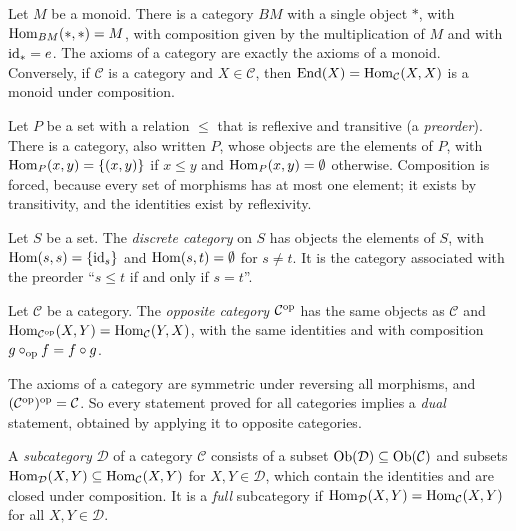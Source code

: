 \begin{example}\label{categories:example-monoid-as-category}
Let $M$ be a monoid. There is a category $BM$ with a single object $\ast$,
with $\operatorname{Hom}_{BM}(\ast, \ast) = M$, with composition given by the multiplication
of $M$ and with $\mathrm{id}_\ast = e$. The axioms of a category are exactly the axioms
of a monoid. Conversely, if $\mathcal{C}$ is a category and $X \in \mathcal{C}$,
then $\operatorname{End}(X) = \operatorname{Hom}_{\mathcal{C}}(X, X)$ is a monoid under composition.
\end{example}

\begin{example}\label{categories:example-preorder}
Let $P$ be a set with a relation $\leq$ that is reflexive and transitive (a
\emph{preorder}). There is a category, also written $P$, whose objects are the
elements of $P$, with $\operatorname{Hom}_P(x, y) = \{(x, y)\}$ if $x \leq y$ and
$\operatorname{Hom}_P(x, y) = \emptyset$ otherwise. Composition is forced, because every set
of morphisms has at most one element; it exists by transitivity, and the
identities exist by reflexivity.
\end{example}

\begin{example}\label{categories:example-discrete}
Let $S$ be a set. The \emph{discrete category} on $S$ has objects the elements
of $S$, with $\operatorname{Hom}(s, s) = \{\mathrm{id}_s\}$ and $\operatorname{Hom}(s, t) = \emptyset$ for
$s \neq t$. It is the category associated with the preorder ``$s \leq t$ if and
only if $s = t$''.
\end{example}

\begin{definition}\label{categories:definition-opposite}
Let $\mathcal{C}$ be a category. The \emph{opposite category}
$\mathcal{C}^{\mathrm{op}}$ has the same objects as $\mathcal{C}$ and
$\operatorname{Hom}_{\mathcal{C}^{\mathrm{op}}}(X, Y) = \operatorname{Hom}_{\mathcal{C}}(Y, X)$, with the same
identities and with composition
$g \circ_{\mathrm{op}} f = f \circ g$.
\end{definition}

\begin{remark}\label{categories:remark-duality}
The axioms of a category are symmetric under reversing all morphisms, and
$(\mathcal{C}^{\mathrm{op}})^{\mathrm{op}} = \mathcal{C}$. So every statement proved for all
categories implies a \emph{dual} statement, obtained by applying it to
opposite categories.
\end{remark}

\begin{definition}\label{categories:definition-subcategory}
A \emph{subcategory} $\mathcal{D}$ of a category $\mathcal{C}$ consists of a
subset $\operatorname{Ob}(\mathcal{D}) \subseteq \operatorname{Ob}(\mathcal{C})$ and subsets
$\operatorname{Hom}_{\mathcal{D}}(X, Y) \subseteq \operatorname{Hom}_{\mathcal{C}}(X, Y)$ for
$X, Y \in \mathcal{D}$, which contain the identities and are closed under
composition. It is a \emph{full} subcategory if
$\operatorname{Hom}_{\mathcal{D}}(X, Y) = \operatorname{Hom}_{\mathcal{C}}(X, Y)$ for all
$X, Y \in \mathcal{D}$.
\end{definition}

